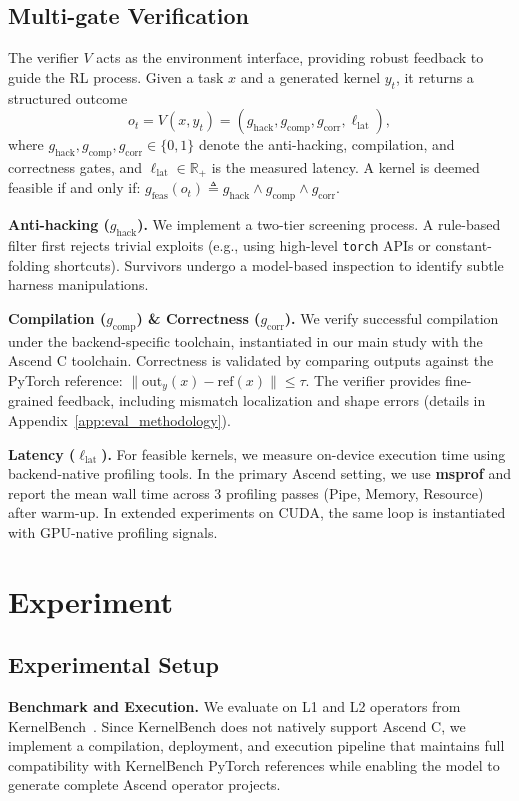 \documentclass{article} %
\theoremstyle{definition}
\theoremstyle{remark}
\begin{document}
\subsection{Multi-gate Verification}
\label{sec:verifier}
The verifier $V$ acts as the environment interface, providing robust feedback to guide the RL process. Given a task $x$ and a generated kernel $y_t$, it returns a structured outcome
\begin{equation}
o_t = V(x, y_t) = (g_{\text{hack}}, g_{\text{comp}}, g_{\text{corr}}, \ell_{\text{lat}}),
\end{equation}
where $g_{\text{hack}}, g_{\text{comp}}, g_{\text{corr}} \in \{0,1\}$ denote the anti-hacking, compilation, and correctness gates, and $\ell_{\text{lat}} \in \mathbb{R}_{+}$ is the measured latency. A kernel is deemed feasible if and only if:
$g_{\text{feas}}(o_t) \triangleq g_{\text{hack}} \wedge g_{\text{comp}} \wedge g_{\text{corr}}$.

\textbf{Anti-hacking ($g_{\text{hack}}$).}
We implement a two-tier screening process. A rule-based filter first rejects trivial exploits (e.g., using high-level \texttt{torch} APIs or constant-folding shortcuts). Survivors undergo a model-based inspection to identify subtle harness manipulations.

\textbf{Compilation ($g_{\text{comp}}$) \& Correctness ($g_{\text{corr}}$).}
We verify successful compilation under the backend-specific toolchain, instantiated in our main study with the Ascend C toolchain. Correctness is validated by comparing outputs against the PyTorch reference: $\|\mathrm{out}_{y}(x)-\mathrm{ref}(x)\| \le \tau$. The verifier provides fine-grained feedback, including mismatch localization and shape errors (details in Appendix~\ref{app:eval_methodology}).

\textbf{Latency ($\ell_{\text{lat}}$).}
For feasible kernels, we measure on-device execution time using backend-native profiling tools. In the primary Ascend setting, we use \textbf{msprof} and report the mean wall time across 3 profiling passes (Pipe, Memory, Resource) after warm-up. In extended experiments on CUDA, the same loop is instantiated with GPU-native profiling signals.

\section{Experiment}
\label{sec:experiments}
\subsection{Experimental Setup}
\label{sec:exp_setup}
\textbf{Benchmark and Execution.}
We evaluate on L1 and L2 operators from KernelBench~\citep{ouyang2025kernel}. Since KernelBench does not natively support Ascend C, we implement a compilation, deployment, and execution pipeline that maintains full compatibility with KernelBench PyTorch references while enabling the model to generate complete Ascend operator projects.
\end{document}
